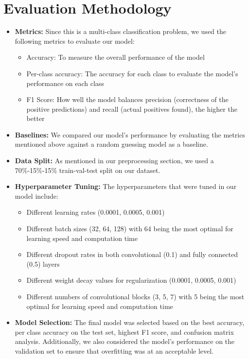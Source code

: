 \documentclass[10pt]{article}
\begin{document}
\section{Evaluation Methodology}

\begin{itemize}
    \item \textbf{Metrics:} Since this is a multi-class classification problem, we used the following metrics to evaluate our model:
    \begin{itemize}
        \item Accuracy: To measure the overall performance of the model
        \item Per-class accuracy: The accuracy for each class to evaluate the model's performance on each class
        \item F1 Score: How well the model balances precision (correctness of the positive predictions) and recall (actual positives found), the higher the better
    \end{itemize}

    \item \textbf{Baselines:} We compared our model's performance by evaluating the metrics mentioned above against a random guessing model as a baseline.

    \item \textbf{Data Split:} As mentioned in our preprocessing section, we used a 70\%-15\%-15\% train-val-test split on our dataset.
    
    \item \textbf{Hyperparameter Tuning:} The hyperparameters that were tuned in our model include:
    \begin{itemize}
        \item Different learning rates (0.0001, 0.0005, 0.001)
        \item Different batch sizes (32, 64, 128) with 64 being the most optimal for learning speed and computation time
        \item Different dropout rates in both convolutional (0.1) and fully connected (0.5) layers
        \item Different weight decay values for regularization (0.0001, 0.0005, 0.001)
        \item Different numbers of convolutional blocks (3, 5, 7) with 5 being the most optimal for learning speed and computation time
    \end{itemize}
    
    \item \textbf{Model Selection:} The final model was selected based on the best accuracy, per class accuracy on the test set, highest F1 score, and confusion matrix analysis. Additionally, we also considered the model's performance on the validation set to ensure that overfitting was at an acceptable level.
\end{itemize}
\end{document}
